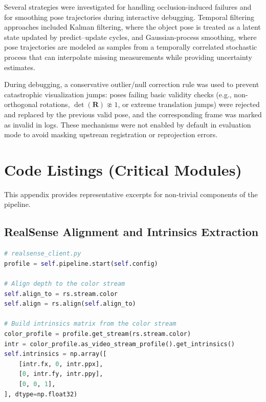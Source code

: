Several strategies were investigated for handling occlusion-induced failures and for smoothing pose trajectories during interactive debugging. Temporal filtering approaches included Kalman filtering, where the object pose is treated as a latent state updated by predict--update cycles, and Gaussian-process smoothing, where pose trajectories are modeled as samples from a temporally correlated stochastic process that can interpolate missing measurements while providing uncertainty estimates.

During debugging, a conservative outlier/null correction rule was used to prevent catastrophic visualization jumps: poses failing basic validity checks (e.g., non-orthogonal rotations, $\det(\mathbf{R}) \not\approx 1$, or extreme translation jumps) were rejected and replaced by the previous valid pose, and the corresponding frame was marked as invalid in logs. These mechanisms were not enabled by default in evaluation mode to avoid masking upstream registration or reprojection errors.

\section{Code Listings (Critical Modules)}
\label{app:code_listings}

This appendix provides representative excerpts for non-trivial components of the pipeline.

\subsection{RealSense Alignment and Intrinsics Extraction}

\begin{lstlisting}[style=code,language=Python,caption={RealSense alignment and intrinsics extraction (aligned depth to color).},label={lst:rs_align_backproject}]
# realsense_client.py
profile = self.pipeline.start(self.config)

# Align depth to the color stream
self.align_to = rs.stream.color
self.align = rs.align(self.align_to)

# Build intrinsics matrix from the color stream
color_profile = profile.get_stream(rs.stream.color)
intr = color_profile.as_video_stream_profile().get_intrinsics()
self.intrinsics = np.array([
    [intr.fx, 0, intr.ppx],
    [0, intr.fy, intr.ppy],
    [0, 0, 1],
], dtype=np.float32)
\end{lstlisting}

